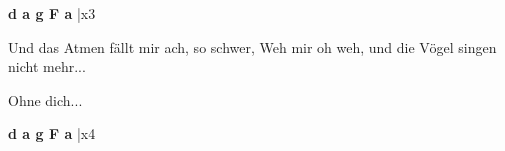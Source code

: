 \documentclass[../../../songbook.tex]{subfiles}
\begin{document}
{\color{red}\textbf{d a g F a} } |x3 \newline

Und das Atmen fällt mir ach, so schwer, \newline
Weh mir oh weh,   und die Vögel singen nicht mehr... \newline
 
\-\hspace{1cm} Ohne dich... \newline
 
{\color{red}\textbf{d a g F a} } |x4 \newline
\end{document}

